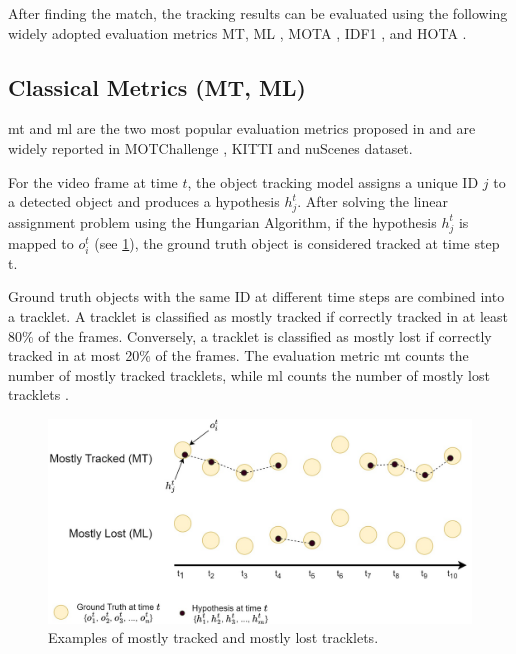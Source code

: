After finding the match, the tracking results can be evaluated using the following widely adopted evaluation metrics MT, ML \citep{wu2006tracking}, MOTA \citep{bernardin2008evaluating}, IDF1 \citep{ristani2016performance}, and HOTA \citep{Luiten2020IJCV}.

\subsection{Classical Metrics (MT, ML)}

\acrfull{mt} and \acrfull{ml} are the two most popular evaluation metrics proposed in \citep{wu2006tracking} and are widely reported in MOTChallenge \citep{dendorfer2020mot20}, KITTI \citep{Geiger2012CVPR} and nuScenes \citep{caesar2020nuscenes} dataset.

For the video frame at time $t$, the object tracking model assigns a unique ID $j$ to a detected object and produces a hypothesis $h_j^t$. After solving the linear assignment problem using the Hungarian Algorithm, if the hypothesis $h_j^t$ is mapped to $o_i^t$ (see \ref{fig:mt_ml}), the ground truth object is considered tracked at time step t.

Ground truth objects with the same ID at different time steps are combined into a tracklet. A tracklet is classified as mostly tracked if correctly tracked in at least 80\% of the frames. Conversely, a tracklet is classified as mostly lost if correctly tracked in at most 20\% of the frames. The evaluation metric \acrshort{mt} counts the number of mostly tracked tracklets, while \acrshort{ml} counts the number of mostly lost tracklets \citep{wu2006tracking}.

\begin{figure}[H]
    \centering
    \includegraphics[width=\linewidth]{figures/chapter_tracking/MT_ML.jpg}
  \caption{Examples of mostly tracked and mostly lost tracklets.}
  \label{fig:mt_ml}
\end{figure}


